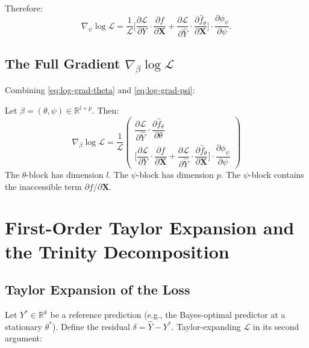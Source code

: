 \documentclass[11pt,a4paper]{article}
\newcommand{\R}{\mathbb{R}}
\newcommand{\calL}{\mathcal{L}}
\newcommand{\bX}{\mathbf{X}}
\begin{document}
Therefore:
\begin{equation}
\nabla_\psi \log \calL = \frac{1}{\calL}\bigg[\frac{\partial \calL}{\partial Y} \cdot \frac{\partial f}{\partial \bX} + \frac{\partial \calL}{\partial \hat{Y}} \cdot \frac{\partial \hat{f}_\theta}{\partial \bX}\bigg] \cdot \frac{\partial \phi_\psi}{\partial \psi}.
\label{eq:log-grad-psi}
\end{equation}

\subsection{The Full Gradient $\nabla_\beta \log \calL$}

Combining \eqref{eq:log-grad-theta} and \eqref{eq:log-grad-psi}:

\begin{keyresult}
Let $\beta = (\theta, \psi) \in \R^{l+p}$. Then:
\begin{equation}
\nabla_\beta \log \calL = \frac{1}{\calL}
\begin{pmatrix}
\dfrac{\partial \calL}{\partial \hat{Y}} \cdot \dfrac{\partial \hat{f}_\theta}{\partial \theta} \\[1.5em]
\bigg[\dfrac{\partial \calL}{\partial Y} \cdot \dfrac{\partial f}{\partial \bX} + \dfrac{\partial \calL}{\partial \hat{Y}} \cdot \dfrac{\partial \hat{f}_\theta}{\partial \bX}\bigg] \cdot \dfrac{\partial \phi_\psi}{\partial \psi}
\end{pmatrix}
\label{eq:full-gradient}
\end{equation}
The $\theta$-block has dimension $l$. The $\psi$-block has dimension $p$. The $\psi$-block contains the inaccessible term $\partial f / \partial \bX$.
\end{keyresult}


\newpage
\section{First-Order Taylor Expansion and the Trinity Decomposition}
\label{sec:taylor}

\subsection{Taylor Expansion of the Loss}

Let $Y^* \in \R^k$ be a reference prediction (e.g., the Bayes-optimal predictor at a stationary $\theta^*$). Define the residual $\delta = \hat{Y} - Y^*$. Taylor-expanding $\calL$ in its second argument:
\end{document}
